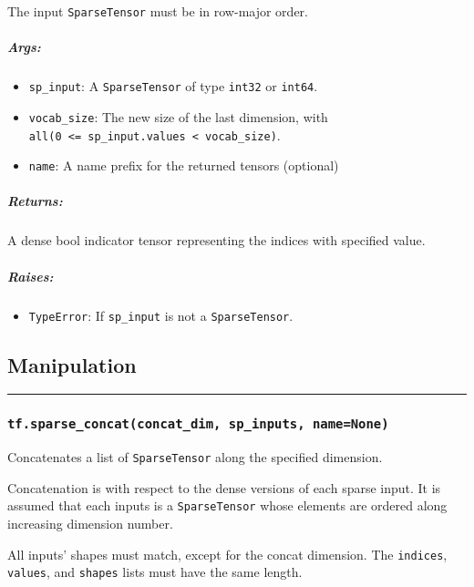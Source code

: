 The input \texttt{SparseTensor} must be in row-major order.

\subparagraph{Args: }\label{args-3}

\begin{itemize}
\tightlist
\item
  \texttt{sp\_input}: A \texttt{SparseTensor} of type \texttt{int32} or
  \texttt{int64}.
\item
  \texttt{vocab\_size}: The new size of the last dimension, with
  \texttt{all(0\ \textless{}=\ sp\_input.values\ \textless{}\ vocab\_size)}.
\item
  \texttt{name}: A name prefix for the returned tensors (optional)
\end{itemize}

\subparagraph{Returns: }\label{returns-5}

A dense bool indicator tensor representing the indices with specified
value.

\subparagraph{Raises: }\label{raises-1}

\begin{itemize}
\tightlist
\item
  \texttt{TypeError}: If \texttt{sp\_input} is not a
  \texttt{SparseTensor}.
\end{itemize}

\subsection{Manipulation }\label{manipulation}

\begin{center}\rule{0.5\linewidth}{\linethickness}\end{center}

\subsubsection{\texorpdfstring{\texttt{tf.sparse\_concat(concat\_dim,\ sp\_inputs,\ name=None)}
}{tf.sparse\_concat(concat\_dim, sp\_inputs, name=None) }}\label{tf.sparseux5fconcatconcatux5fdim-spux5finputs-namenone}

Concatenates a list of \texttt{SparseTensor} along the specified
dimension.

Concatenation is with respect to the dense versions of each sparse
input. It is assumed that each inputs is a \texttt{SparseTensor} whose
elements are ordered along increasing dimension number.

All inputs' shapes must match, except for the concat dimension. The
\texttt{indices}, \texttt{values}, and \texttt{shapes} lists must have
the same length.

